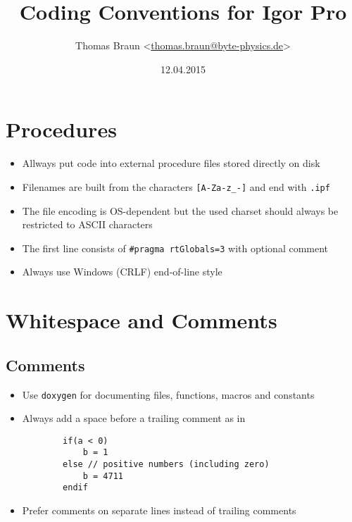 \documentclass{scrartcl}
\date{12.04.2015}
\author{Thomas Braun <\url{thomas.braun@byte-physics.de}>}
\title{Coding Conventions for Igor Pro}
\begin{document}
%
\maketitle
%
\section{Procedures}
%
\begin{itemize}
	\item Allways put code into external procedure files stored directly on disk
%	
	\item Filenames are built from the characters \texttt{[A-Za-z_-]} and end with \texttt{.ipf}
%	
	\item The file encoding is OS-dependent but the used charset should always be restricted to ASCII characters
%	
	\item The first line consists of \texttt{#pragma rtGlobals=3} with optional comment
%	
	\item Always use Windows (CRLF) end-of-line style
\end{itemize}
%
\section{Whitespace and Comments}
%
\subsection*{Comments}
%
\begin{itemize}
	\item Use \texttt{doxygen} for documenting files, functions, macros and constants
%	
	\item Always add a space before a trailing comment as in
	\begin{verbatim}
		if(a < 0)
			b = 1
		else // positive numbers (including zero)
			b = 4711
		endif
	\end{verbatim}
%	
	\item Prefer comments on separate lines instead of trailing comments
%	
\end{itemize}
%	
\end{document}

